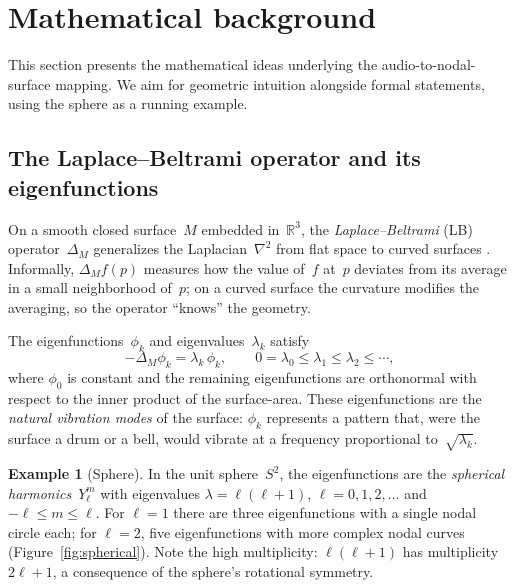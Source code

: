 \documentclass[]{interact}
\theoremstyle{plain}
\theoremstyle{definition}
\newtheorem{example}[theorem]{Example}
\theoremstyle{remark}
\begin{document}
\section{Mathematical background}
\label{sec:background}

This section presents the mathematical ideas underlying the audio-to-nodal-surface mapping. We aim for geometric intuition alongside formal statements, using the sphere as a running example.

\subsection{The Laplace--Beltrami operator and its eigenfunctions}
\label{sec:lb}

On a smooth closed surface~$M$ embedded in~$\mathbb{R}^3$, the \emph{Laplace--Beltrami} (LB) operator~$\Delta_M$ generalizes the Laplacian~$\nabla^2$ from flat space to curved surfaces \citep{rosenberg1997laplacian}. Informally, $\Delta_M f(p)$ measures how the value of~$f$ at~$p$ deviates from its average in a small neighborhood of~$p$; on a curved surface the curvature modifies the averaging, so the operator ``knows'' the geometry.

The eigenfunctions~$\phi_k$ and eigenvalues~$\lambda_k$ satisfy
\begin{equation}
\label{eq:eigenvalue}
-\Delta_M \phi_k = \lambda_k \, \phi_k,
\qquad 0 = \lambda_0 \le \lambda_1 \le \lambda_2 \le \cdots,
\end{equation}
where $\phi_0$ is constant and the remaining eigenfunctions are orthonormal with respect to the inner product of the surface-area. These eigenfunctions are the \emph{natural vibration modes} of the surface: $\phi_k$ represents a pattern that, were the surface a drum or a bell, would vibrate at a frequency proportional to~$\sqrt{\lambda_k}$.

\begin{example}[Sphere]
In the unit sphere~$S^2$, the eigenfunctions are the \emph{spherical harmonics}~$Y_\ell^m$ with eigenvalues $\lambda = \ell(\ell+1)$, $\ell = 0,1,2,\ldots$ and $-\ell \le m \le \ell$. For $\ell=1$ there are three eigenfunctions with a single nodal circle each; for $\ell=2$, five eigenfunctions with more complex nodal curves (Figure~\ref{fig:spherical}). Note the high multiplicity: $\ell(\ell+1)$ has multiplicity~$2\ell+1$, a consequence of the sphere's rotational symmetry.
\end{example}
\end{document}
